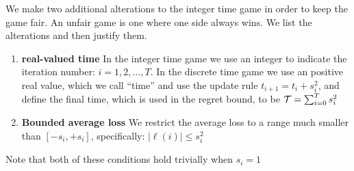 \documentclass{article}[12pt]
\begin{document}
We make two additional alterations to the integer time game in order to
keep the game fair. An unfair game is one where one side always wins.
We list the alterations and then justify them.
\begin{enumerate}
\item {\bf real-valued time} In the integer time game we use an
  integer to indicate the iteration number: $i=1,2,\ldots,T$. In the
  discrete time game we use an positive real value, which we call
  ``time'' and use the update rule $t_{i+1} = t_i + s_i^2$, and define
  the final time, which is used in the regret bound, to be
  $\mathcal{T}=\sum_{i=0}^T s_i^2$
\item {\bf Bounded average loss} We restrict the average loss to a
  range much smaller than $[-s_i,+s_i]$, specifically:
  $|\ell(i)| \leq s_i^2$
\end{enumerate}
Note that both of these conditions hold trivially when $s_i=1$
\end{document}
